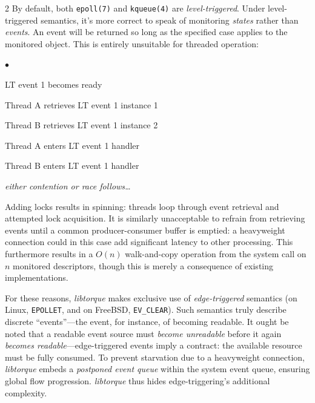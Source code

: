 \documentclass[letterpaper,10pt]{article}
\newcommand{\squishlist}{\begin{list}{$\bullet$}
  {\setlength{\itemsep}{0pt}
    \setlength{\parsep}{3pt}
    \setlength{\topsep}{3pt}
    \setlength{\partopsep}{0pt}
    \setlength{\leftmargin}{1.5em}
    \setlength{\labelwidth}{1em}
    \setlength{\labelsep}{0.5em}}}
\newcommand{\squishend}{\end{list}}
\begin{document}
\begin{multicols}{2}
By default, both \texttt{epoll(7)} and \texttt{kqueue(4)} are \textit{level-triggered}.
Under level-triggered semantics, it's more correct to speak of monitoring 
\textit{states} rather than \textit{events}. An event will be returned so long
as the specified case applies to the monitored object. This is entirely unsuitable
for threaded operation:
\squishlist %
\item LT event 1 becomes ready
\item Thread A retrieves LT event 1 instance 1
\item Thread B retrieves LT event 1 instance 2
\item Thread A enters LT event 1 handler
\item Thread B enters LT event 1 handler
\item \textit{either contention or race follows\ldots}
\squishend
Adding locks results in spinning: threads loop through event retrieval and attempted
lock acquisition. It is similarly unacceptable to refrain from retrieving events
until a common producer-consumer buffer is emptied: a heavyweight connection could in this case
add significant latency to other processing. This furthermore results in a $O(n)$
walk-and-copy operation from the system call on $n$ monitored descriptors, though
this is merely a consequence of existing implementations.

For these reasons, \textit{libtorque} makes exclusive use of
\textit{edge-triggered} semantics (on Linux, \texttt{EPOLLET}, and on FreeBSD,
\texttt{EV\_CLEAR}). Such semantics truly describe discrete ``events''---the
event, for instance, of becoming readable. It ought be noted that a readable event source
must \textit{become unreadable} before it again \textit{becomes readable}---edge-triggered
events imply a contract: the available resource must be fully consumed. To
prevent starvation due to a heavyweight connection, \textit{libtorque}
embeds a \textit{postponed event queue} within the system event queue,
ensuring global flow progression. \textit{libtorque} thus hides
edge-triggering's additional complexity.


\end{multicols}
\end{document}
